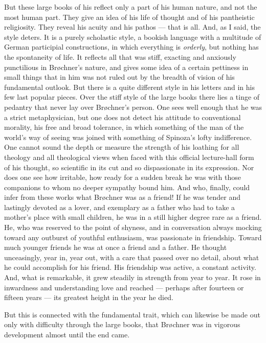 \documentclass[12pt,a4paper,openany]{book}
\newcommand{\opage}[1]{\marginnote{\footnotesize\textit{[#1]}}}
\begin{document}
But these large books of his reflect only a part of his human nature, and not
the most human part. They give an idea of his life of thought and of his
pantheistic religiosity. They reveal his
\opage{245}acuity and his pathos --- that is all. And, as I said, the style deters. It is
a purely scholastic style, a bookish language with a multitude of German
participial constructions, in which everything is \emph{orderly}, but nothing
has the spontaneity of life. It reflects all that was stiff, exacting and
anxiously punctilious in Brøchner's nature, and gives some idea of a certain
pettiness in small things that in him was not ruled out by the breadth of
vision of his fundamental outlook. But there is a quite different style in his
letters and in his few last popular pieces. Over the stiff style of the large
books there lies a tinge of pedantry that never lay over Brøchner's person. One
sees well enough that he was a strict metaphysician, but one does not detect
his attitude to conventional morality, his free and broad tolerance, in which
something of the man of the world's way of seeing was joined with something of
Spinoza's lofty indifference. One cannot sound the depth or measure the
strength of his loathing for all theology and all theological views when faced
with this official lecture-hall form of his thought, so scientific in its cut
and so dispassionate in its expression. Nor does one see how irritable, how
ready for a sudden break he was with those companions to whom no deeper
sympathy bound him.
\opage{246}And who, finally, could infer from these works what Brøchner was as a friend!
If he was tender and lastingly devoted as a lover, and exemplary as a father
who had to take a mother's place with small children, he was in a still higher
degree rare as a friend. He, who was reserved to the point of shyness, and in
conversation always mocking toward any outburst of youthful enthusiasm, was
passionate in friendship. Toward much younger friends he was at once a friend
and a father. He thought unceasingly, year in, year out, with a care that
passed over no detail, about what he could accomplish for his friend. His
friendship was active, a constant activity. And, what is remarkable, it grew
steadily in strength from year to year. It rose in inwardness and
understanding love and reached --- perhaps after fourteen or fifteen years
--- its greatest height in the year he died.

But this is connected with the fundamental trait, which can likewise be made
out only with difficulty through the large books, that Brøchner was in vigorous
development almost until the end came.
\end{document}

